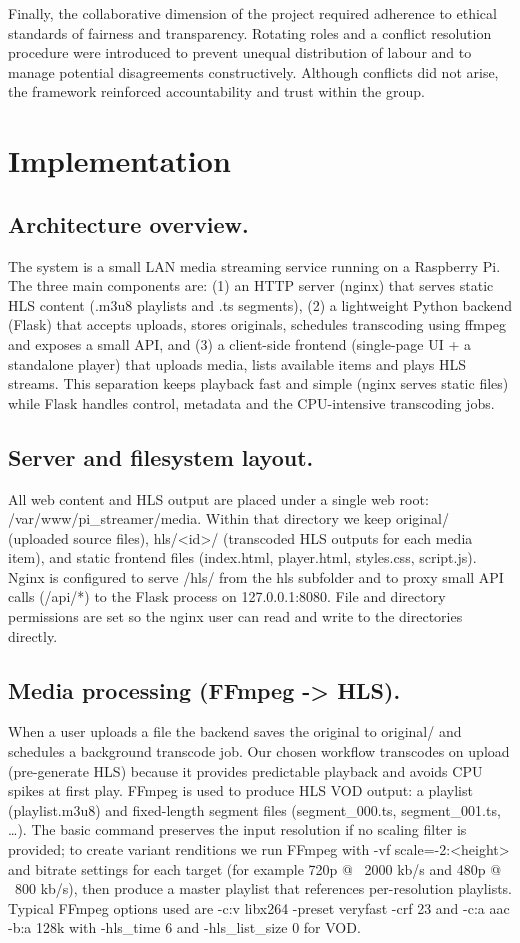 \documentclass[11pt]{report}
\begin{document}
Finally, the collaborative dimension of the project required adherence to ethical standards of fairness and transparency. Rotating roles and a conflict resolution procedure were introduced to prevent unequal distribution of labour and to manage potential disagreements constructively. Although conflicts did not arise, the framework reinforced accountability and trust within the group.

\chapter{Implementation}
\section{Architecture overview.}
The system is a small LAN media streaming service running on a Raspberry Pi. The three main components are: (1) an HTTP server (nginx) that serves static HLS content (.m3u8 playlists and .ts segments), (2) a lightweight Python backend (Flask) that accepts uploads, stores originals, schedules transcoding using ffmpeg and exposes a small API, and (3) a client-side frontend (single-page UI + a standalone player) that uploads media, lists available items and plays HLS streams. This separation keeps playback fast and simple (nginx serves static files) while Flask handles control, metadata and the CPU-intensive transcoding jobs.

\section{Server and filesystem layout.}
All web content and HLS output are placed under a single web root: /var/www/pi\_streamer/media. Within that directory we keep original/ (uploaded source files), hls/<id>/ (transcoded HLS outputs for each media item), and static frontend files (index.html, player.html, styles.css, script.js). Nginx is configured to serve /hls/ from the hls subfolder and to proxy small API calls (/api/*) to the Flask process on 127.0.0.1:8080. File and directory permissions are set so the nginx user can read and write to the directories directly.

\section{Media processing (FFmpeg -> HLS).}
When a user uploads a file the backend saves the original to original/ and schedules a background transcode job. Our chosen workflow transcodes on upload (pre-generate HLS) because it provides predictable playback and avoids CPU spikes at first play. FFmpeg is used to produce HLS VOD output: a playlist (playlist.m3u8) and fixed-length segment files (segment\_000.ts, segment\_001.ts, …). The basic command preserves the input resolution if no scaling filter is provided; to create variant renditions we run FFmpeg with -vf scale=-2:<height> and bitrate settings for each target (for example 720p @ ~2000 kb/s and 480p @ ~800 kb/s), then produce a master playlist that references per-resolution playlists. Typical FFmpeg options used are -c:v libx264 -preset veryfast -crf 23 and -c:a aac -b:a 128k with -hls\_time 6 and -hls\_list\_size 0 for VOD.
\end{document}
